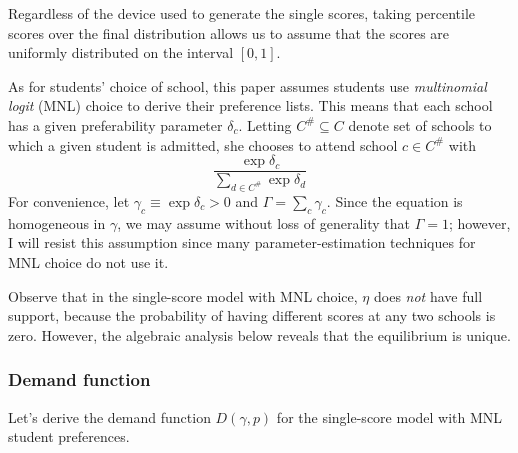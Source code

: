 \documentclass[12pt]{article}
\theoremstyle{definition}
\begin{document}
Regardless of the device used to generate the single scores, taking percentile scores over the final distribution allows us to assume that the scores are uniformly distributed on the interval $[0,1]$. 

As for students' choice of school, this paper assumes students use \emph{multinomial logit} (MNL) choice to derive their preference lists. This means that each school has a given preferability parameter $\delta_c$. Letting $C^\# \subseteq C$ denote set of schools to which a given student is admitted, she chooses to attend school $c \in C^\#$ with
\[\frac{\exp \delta_c}{\sum_{d \in C^\#} \exp \delta_d}\]
For convenience, let $\gamma_c \equiv \exp \delta_c > 0$ and $\Gamma = \sum_c \gamma_c$. Since the equation is homogeneous in $\gamma$, we may assume without loss of generality that $\Gamma = 1$; however, I will resist this assumption since many parameter-estimation techniques for MNL choice do not use it. 

Observe that in the single-score model with MNL choice, $\eta$ does \emph{not} have full support, because the probability of having different scores at any two schools is zero. However, the algebraic analysis below reveals that the equilibrium is unique. 

\subsubsection{Demand function}
Let's derive the demand function $D(\gamma, p)$ for the single-score model with MNL student preferences.
\end{document}
